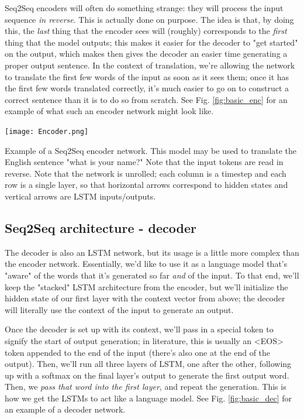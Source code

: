 \documentclass{tufte-handout}
\begin{document}
Seq2Seq encoders will often do something strange: they will process the input sequence \textit{in reverse}. This is actually done on purpose. The idea is that, by doing this, the \textit{last} thing that the encoder sees will (roughly) corresponds to the \textit{first} thing that the model outputs; this makes it easier for the decoder to "get started" on the output, which makes then gives the decoder an easier time generating a proper output sentence. In the context of translation, we're allowing the network to translate the first few words of the input as soon as it sees them; once it has the first few words translated correctly, it's much easier to go on to construct a correct sentence than it is to do so from scratch. See Fig. \ref{fig:basic_enc} for an example of what such an encoder network might look like.

\begin{marginfigure}
	\centering
	\texttt{[image: Encoder.png]}
	\caption {Example of a Seq2Seq encoder network. This model may be used to translate the English sentence "what is your name?" Note that the input tokens are read in reverse. Note that the network is unrolled; each column is a timestep and each row is a single layer, so that horizontal arrows correspond to hidden states and vertical arrows are LSTM inputs/outputs.}
	\label{fig:basic_enc}
\end{marginfigure}

\subsection{Seq2Seq architecture - decoder}

The decoder is also an LSTM network, but its usage is a little more complex than the encoder network. Essentially, we'd like to use it as a language model that's "aware" of the words that it's generated so far \textit{and} of the input. To that end, we'll keep the "stacked" LSTM architecture from the encoder, but we'll initialize the hidden state of our first layer with the context vector from above; the decoder will literally use the context of the input to generate an output.

Once the decoder is set up with its context, we'll pass in a special token to signify the start of output generation; in literature, this is usually an <EOS> token appended to the end of the input (there's also one at the end of the output). Then, we'll run all three layers of LSTM, one after the other, following up with a softmax on the final layer's output to generate the first output word. Then, we \textit{pass that word into the first layer}, and repeat the generation. This is how we get the LSTMs to act like a language model. See Fig. \ref{fig:basic_dec} for an example of a decoder network.
\end{document}
